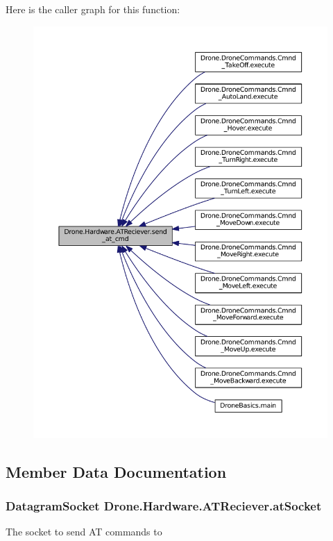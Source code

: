 Here is the caller graph for this function\+:\nopagebreak
\begin{figure}[H]
\begin{center}
\leavevmode
\includegraphics[width=350pt]{class_drone_1_1_hardware_1_1_a_t_reciever_a93352d75209626cf62bde294b35f9120_icgraph}
\end{center}
\end{figure}




\subsection{Member Data Documentation}
\hypertarget{class_drone_1_1_hardware_1_1_a_t_reciever_ac5f975b3bdd5cf7346ff6649daf831aa}{}
\subsubsection[{at\+Socket}]{\setlength{\rightskip}{0pt plus 5cm}Datagram\+Socket Drone.\+Hardware.\+A\+T\+Reciever.\+at\+Socket\hspace{0.3cm}{\ttfamily [private]}}\label{class_drone_1_1_hardware_1_1_a_t_reciever_ac5f975b3bdd5cf7346ff6649daf831aa}
The socket to send A\+T commands to 

